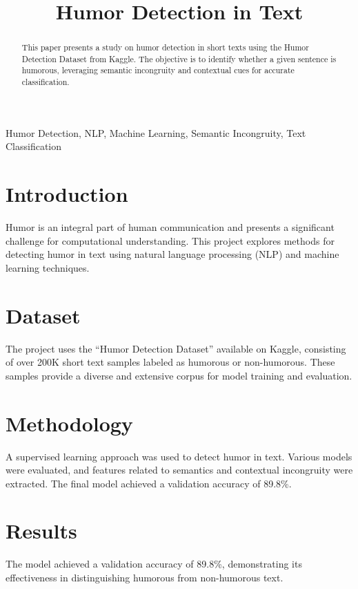\documentclass[conference]{IEEEtran}
\begin{document}
\title{Humor Detection in Text}

\author{
}

\maketitle

\begin{abstract}
This paper presents a study on humor detection in short texts using the Humor Detection Dataset from Kaggle. The objective is to identify whether a given sentence is humorous, leveraging semantic incongruity and contextual cues for accurate classification.
\end{abstract}

\begin{IEEEkeywords}
Humor Detection, NLP, Machine Learning, Semantic Incongruity, Text Classification
\end{IEEEkeywords}

\section{Introduction}
Humor is an integral part of human communication and presents a significant challenge for computational understanding. This project explores methods for detecting humor in text using natural language processing (NLP) and machine learning techniques.

\section{Dataset}
The project uses the ``Humor Detection Dataset'' available on Kaggle, consisting of over 200K short text samples labeled as humorous or non-humorous. These samples provide a diverse and extensive corpus for model training and evaluation.

\section{Methodology}
A supervised learning approach was used to detect humor in text. Various models were evaluated, and features related to semantics and contextual incongruity were extracted. The final model achieved a validation accuracy of 89.8\%.

\section{Results}
The model achieved a validation accuracy of 89.8\%, demonstrating its effectiveness in distinguishing humorous from non-humorous text.
\end{document}
